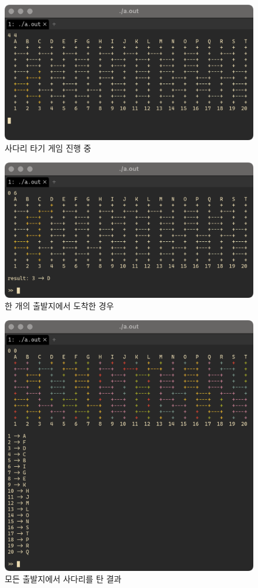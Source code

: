 \documentclass[titlepage]{article}
\begin{document}
\begin{figure}[H]
  \centering
  \includegraphics[width=0.7\linewidth]{play_progress.png}
  \caption{사다리 타기 게임 진행 중}
\end{figure}

\begin{figure}[H]
  \centering
  \includegraphics[width=0.7\linewidth]{play_finish_one.png}
  \caption{한 개의 출발지에서 도착한 경우}
\end{figure}

\begin{figure}[H]
  \centering
  \includegraphics[width=0.7\linewidth]{play_finish_all.png}
  \caption{모든 출발지에서 사다리를 탄 결과}
\end{figure}
\end{document}
